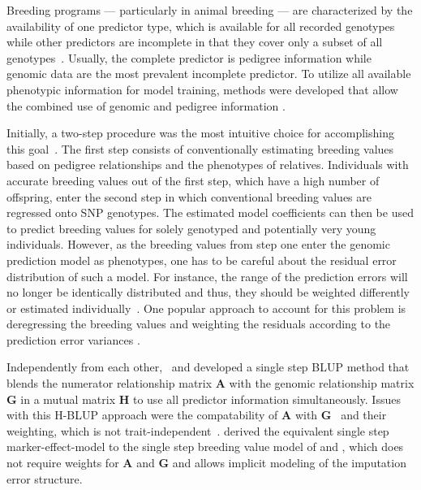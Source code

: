 \documentclass[12pt,titlepage]{article}
\begin{document}
Breeding programs --- particularly in animal breeding --- are characterized by
the availability of one predictor type, which is available for all recorded
genotypes while other predictors are incomplete in that they cover only a 
subset of all genotypes~\cite{Fragomeni2015}.
Usually, the complete predictor is pedigree information while genomic data are
the most prevalent incomplete predictor.
To utilize all available phenotypic information for model training, methods were 
developed that allow the combined use of genomic and pedigree information 
\cite{Hayes2009a,VanRaden2009}.

Initially, a two-step procedure was the most intuitive choice for accomplishing
this goal~\cite{VanRaden2009}.
The first step consists of conventionally estimating breeding values based on
pedigree relationships and the phenotypes of relatives.
Individuals with accurate breeding values out of the first step, which have a
high number of offspring, enter the second step in which conventional breeding
values are regressed onto SNP genotypes.
The estimated model coefficients can then be used to predict breeding values
for solely genotyped and potentially very young individuals.
However, as the breeding values from step one enter the genomic prediction
model as phenotypes, one has to be careful about the residual error
distribution of such a model.
For instance, the range of the prediction errors will no longer be identically
distributed and thus, they should be weighted differently or estimated 
individually~\cite{Aguilar2010}.
One popular approach to account for this problem is deregressing the breeding
values and weighting the residuals according to the prediction error variances
\cite{Garrick2009}.

Independently from each other,~ and
 developed a single step BLUP method that blends the 
numerator relationship matrix $\mathbf{A}$ with the genomic relationship matrix
$\mathbf{G}$ in a mutual matrix $\mathbf{H}$ to use all predictor information
simultaneously.
Issues with this H-BLUP approach were the compatability of $\mathbf{A}$ with
$\mathbf{G}$~\cite{Christensen2012} and their weighting, which is not
trait-independent~\cite{Vitezica2011,Ashraf2016}.
 derived the equivalent single step marker-effect-model to 
the single step breeding value model of  and 
, which does not require weights for $\mathbf{A}$ and 
$\mathbf{G}$ and allows implicit modeling of the imputation error structure.
\end{document}
